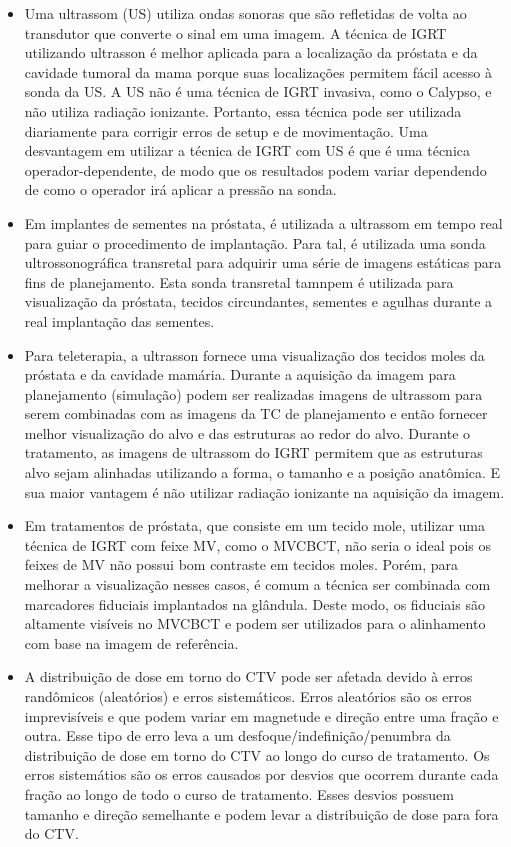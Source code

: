 \documentclass[11pt,a4paper]{article}
\newcounter{exemplo}
\begin{document}
\begin{exemplo}[IGRT]
\begin{itemize}
        \item Uma ultrassom (US) utiliza ondas sonoras que são refletidas de volta ao transdutor que converte o sinal em uma imagem. A técnica de IGRT utilizando ultrasson é melhor aplicada para a localização da próstata e da cavidade tumoral da mama porque suas localizações permitem fácil acesso à sonda da US. A US não é uma técnica de IGRT invasiva, como o Calypso, e não utiliza radiação ionizante. Portanto, essa técnica pode ser utilizada diariamente para corrigir erros de setup e de movimentação. Uma desvantagem em utilizar a técnica de IGRT com US é que é uma técnica operador-dependente, de modo que os resultados podem variar dependendo de como o operador irá aplicar a pressão na sonda. 
        
        \item Em implantes de sementes na próstata, é utilizada a ultrassom em tempo real para guiar o procedimento de implantação. Para tal, é utilizada uma sonda ultrossonográfica transretal para adquirir uma série de imagens estáticas para fins de planejamento. Esta sonda transretal tamnpem é utilizada para visualização da próstata, tecidos circundantes, sementes e agulhas durante a real implantação das sementes.
        
        \item Para teleterapia, a ultrasson fornece uma visualização dos tecidos moles da próstata e da cavidade mamária. Durante a aquisição da imagem para planejamento (simulação) podem ser realizadas imagens de ultrassom para serem combinadas com as imagens da TC de planejamento e então fornecer melhor visualização do alvo e das estruturas ao redor do alvo. Durante o tratamento, as imagens de ultrassom do IGRT permitem que as estruturas alvo sejam alinhadas utilizando a forma, o tamanho e a posição anatômica. E sua maior vantagem é não utilizar radiação ionizante na aquisição da imagem.
        
        \item Em tratamentos de próstata, que consiste em um tecido mole, utilizar uma técnica de IGRT com feixe MV, como o MVCBCT, não seria o ideal pois os feixes de MV não possui bom contraste em tecidos moles. Porém, para melhorar a visualização nesses casos, é comum a técnica ser combinada com marcadores fiduciais implantados na glândula. Deste modo, os fiduciais são altamente visíveis no MVCBCT e podem ser utilizados para o alinhamento com base na imagem de referência.
        
        \item A distribuição de dose em torno do CTV pode ser afetada devido à erros randômicos (aleatórios) e erros sistemáticos. Erros aleatórios são os erros imprevisíveis e que podem variar em magnetude e direção entre uma fração e outra. Esse tipo de erro leva a um desfoque/indefinição/penumbra da distribuição de dose em torno do CTV ao longo do curso de tratamento. Os erros sistemátios são os erros causados por desvios que ocorrem durante cada fração ao longo de todo o curso de tratamento. Esses desvios possuem tamanho e direção semelhante e podem levar a distribuição de dose para fora do CTV.
        

\end{itemize}
\end{exemplo}
\end{document}
